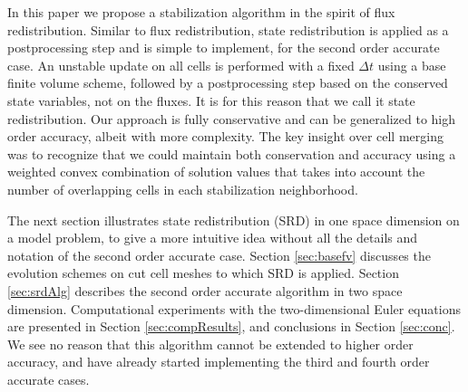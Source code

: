 In this paper we propose a stabilization algorithm in
the spirit of flux redistribution. Similar to flux redistribution, state
redistribution is applied as a postprocessing step and is simple to implement,
for the second order accurate case. An unstable update on all cells is
performed with a fixed $\Delta t$ using a base finite volume scheme, followed
by a postprocessing step based on the conserved state variables, not on the
fluxes.  It is for this reason that we call it state redistribution.  Our
approach is fully conservative and can be generalized to high order accuracy,
albeit with  more complexity. The key insight over cell merging was to
recognize that we could maintain both conservation and accuracy using a
weighted convex combination of solution values that takes into account the number of
overlapping cells in each stabilization neighborhood.

The next section illustrates state redistribution (SRD) in one space dimension
on a model problem, to give a more intuitive idea without all the details and 
notation of the second order accurate  case.
Section \ref{sec:basefv} discusses the evolution schemes on cut cell meshes
to which SRD is applied.
Section \ref{sec:srdAlg} describes the second order accurate
algorithm in two space dimension.  Computational experiments with the
two-dimensional Euler equations  are presented in
Section \ref{sec:compResults}, and conclusions in Section \ref{sec:conc}. 
We see no reason that this algorithm cannot be extended to higher order
accuracy, and have already started implementing the third and fourth
order accurate cases.

